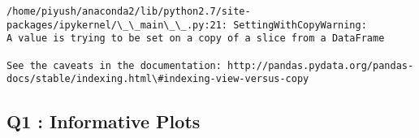 \documentclass[11pt]{article}
\begin{document}
    \begin{Verbatim}[commandchars=\\\{\}]
/home/piyush/anaconda2/lib/python2.7/site-packages/ipykernel/\_\_main\_\_.py:21: SettingWithCopyWarning: 
A value is trying to be set on a copy of a slice from a DataFrame

See the caveats in the documentation: http://pandas.pydata.org/pandas-docs/stable/indexing.html\#indexing-view-versus-copy

    \end{Verbatim}

    \subsection{Q1 : Informative Plots}\label{q1-informative-plots}
\end{document}
